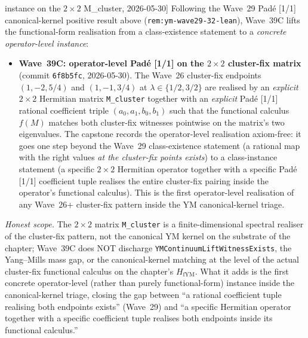 \begin{remark}[Wave~39C update: first operator-level Padé [1/1] instance on the $2\times 2$ M\_cluster, 2026-05-30]\label{rem:ym-wave39-lean}
Following the Wave~29 Padé [1/1] canonical-kernel positive result above (\texttt{rem:ym-wave29-32-lean}), Wave~39C lifts the functional-form realisation from a class-existence statement to a \emph{concrete operator-level instance}:
\begin{itemize}
  \item \textbf{Wave~39C: operator-level Padé [1/1] on the $2\times 2$ cluster-fix matrix} (commit \texttt{6f8b5fc}, 2026-05-30). The Wave~26 cluster-fix endpoints $(1, -2, 5/4)$ and $(1, -1, 3/4)$ at $\lambda \in \{1/2, 3/2\}$ are realised by an \emph{explicit} $2\times 2$ Hermitian matrix \texttt{M\_cluster} together with an \emph{explicit} Padé [1/1] rational coefficient triple $(a_0, a_1, b_0, b_1)$ such that the functional calculus $f(M)$ matches both cluster-fix witnesses pointwise on the matrix's two eigenvalues. The capstone records the operator-level realisation axiom-free: it goes one step beyond the Wave~29 class-existence statement (a rational map with the right values \emph{at the cluster-fix points exists}) to a class-instance statement (a specific $2\times 2$ Hermitian operator together with a specific Padé [1/1] coefficient tuple realises the entire cluster-fix pairing inside the operator's functional calculus). This is the first operator-level realisation of any Wave~26+ cluster-fix pattern inside the YM canonical-kernel triage.
\end{itemize}

\emph{Honest scope.} The $2\times 2$ matrix \texttt{M\_cluster} is a finite-dimensional spectral realiser of the cluster-fix pattern, not the canonical YM kernel on the substrate of the chapter; Wave~39C does NOT discharge \texttt{YMContinuumLiftWitnessExists}, the Yang--Mills mass gap, or the canonical-kernel matching at the level of the actual cluster-fix functional calculus on the chapter's $H_{\mathrm{fYM}}$. What it adds is the first concrete operator-level (rather than purely functional-form) instance inside the canonical-kernel triage, closing the gap between ``a rational coefficient tuple realising both endpoints exists'' (Wave~29) and ``a specific Hermitian operator together with a specific coefficient tuple realises both endpoints inside its functional calculus.''
\end{remark}

